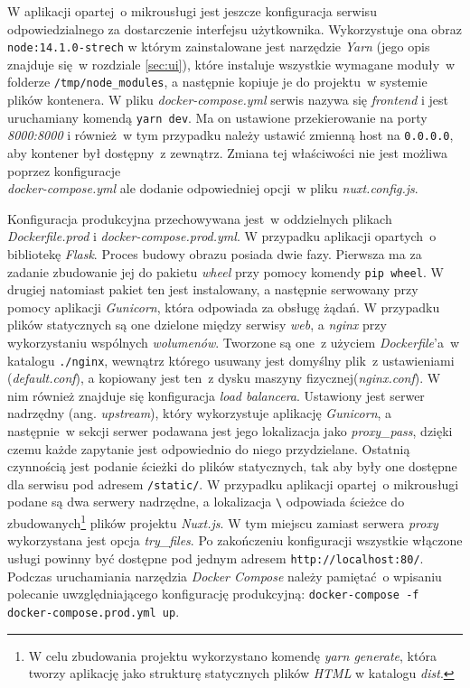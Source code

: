 W aplikacji opartej~o mikrousługi jest jeszcze konfiguracja serwisu odpowiedzialnego za dostarczenie interfejsu użytkownika. Wykorzystuje ona obraz \\ \verb|node:14.1.0-strech| w którym zainstalowane jest narzędzie \textit{Yarn} (jego opis znajduje się~w rozdziale \ref{sec:ui}), które instaluje wszystkie wymagane moduły~w folderze \verb|/tmp/node_modules|, a następnie kopiuje je do projektu~w systemie plików kontenera. W pliku \textit{docker-compose.yml} serwis nazywa się \textit{frontend} i jest uruchamiany komendą \verb|yarn dev|. Ma on ustawione przekierowanie na porty \textit{8000:8000} i również~w tym przypadku należy ustawić zmienną host na \verb|0.0.0.0|, aby kontener był dostępny~z zewnątrz. Zmiana tej właściwości nie jest możliwa poprzez konfiguracje \\ \textit{docker-compose.yml} ale dodanie odpowiedniej opcji~w pliku \textit{nuxt.config.js}\cite{nuxtjs}.

Konfiguracja produkcyjna przechowywana jest~w oddzielnych plikach \textit{Dockerfile.prod} i \textit{docker-compose.prod.yml}. W przypadku aplikacji opartych~o bibliotekę \textit{Flask}. Proces budowy obrazu posiada dwie fazy\cite{Herman:2020}. Pierwsza ma za zadanie zbudowanie jej do pakietu \textit{wheel} przy pomocy komendy \verb|pip wheel|. W drugiej natomiast pakiet ten jest instalowany, a następnie serwowany przy pomocy aplikacji \textit{Gunicorn}, która odpowiada za obsługę żądań. W przypadku plików statycznych są one dzielone między serwisy \textit{web}, a \textit{nginx} przy wykorzystaniu wspólnych \textit{wolumenów}\cite{docker}. Tworzone są one~z użyciem \textit{Dockerfile}'a~w katalogu \verb|./nginx|, wewnątrz którego usuwany jest domyślny plik~z ustawieniami (\textit{default.conf}), a kopiowany jest ten~z dysku maszyny fizycznej(\textit{nginx.conf}). W nim również znajduje się konfiguracja \textit{load balancera}\cite{nginx}. Ustawiony jest serwer nadrzędny (ang. \textit{upstream}), który wykorzystuje aplikację \textit{Gunicorn}, a następnie~w sekcji serwer podawana jest jego lokalizacja jako \textit{proxy\_pass}, dzięki czemu każde zapytanie jest odpowiednio do niego przydzielane. Ostatnią czynnością jest podanie ścieżki do plików statycznych, tak aby były one dostępne dla serwisu pod adresem \verb|/static/|. W przypadku aplikacji opartej~o mikrousługi podane są dwa serwery nadrzędne, a lokalizacja \verb|\| odpowiada ścieżce do zbudowanych\footnote{W celu zbudowania projektu wykorzystano komendę \textit{yarn generate}, która tworzy aplikację jako strukturę statycznych plików \textit{HTML} w katalogu \textit{dist}.} plików projektu \textit{Nuxt.js}\cite{nuxtjs}. W tym miejscu zamiast serwera \textit{proxy} wykorzystana jest opcja \textit{try\_files}\cite{nginx}. Po zakończeniu konfiguracji wszystkie włączone usługi powinny być dostępne pod jednym adresem \verb|http://localhost:80/|. Podczas uruchamiania narzędzia \textit{Docker Compose} należy pamiętać~o wpisaniu polecanie uwzględniającego konfigurację produkcyjną: \verb|docker-compose -f docker-compose.prod.yml up|.

